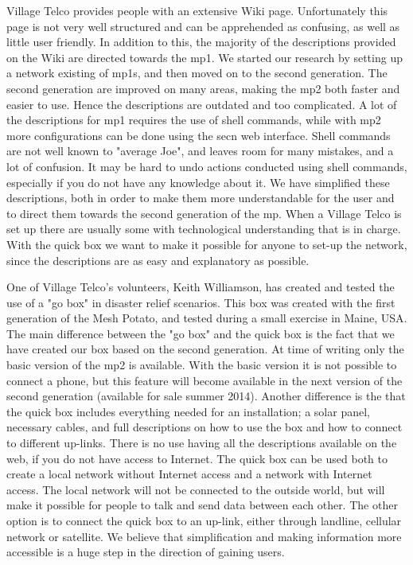 Village Telco provides people with an extensive Wiki page. Unfortunately this page is not very well structured and can be apprehended as confusing, as well as little user friendly. In addition to this, the majority of the descriptions provided on the Wiki are directed towards the \gls{mp1}. We started our research by setting up a network existing of \glspl{mp1}, and then moved on to the second generation. The second generation are improved on many areas, making the \gls{mp2} both faster and easier to use. Hence the descriptions are outdated and too complicated. A lot of the descriptions for \gls{mp1} requires the use of shell commands, while with \gls{mp2} more configurations can be done using the \gls{secn} web interface. Shell commands are not well known to "average Joe", and leaves room for many mistakes, and a lot of confusion. It may be hard to undo actions conducted using shell commands, especially if you do not have any knowledge about it. We have simplified these descriptions, both in order to make them more understandable for the user and to direct them towards the second generation of the \gls{mp}. When a Village Telco is set up there are usually some with technological understanding that is in charge. With the \gls{quick} box we want to make it possible for anyone to set-up the network, since the descriptions are as easy and explanatory as possible. 

One of Village Telco's volunteers, Keith Williamson, has created and tested the use of a "go box" in disaster relief scenarios. This box was created with the first generation of the Mesh Potato, and tested during a small exercise in Maine, USA. The main difference between the "go box" and the \gls{quick} box is the fact that we have created our box based on the second generation. At time of writing only the basic version of the \gls{mp2} is available. With the basic version it is not possible to connect a phone, but this feature will become available in the next version of the second generation (available for sale summer 2014). Another difference is the that the \gls{quick} box includes everything needed for an installation;  a solar panel, necessary cables, and full descriptions on how to use the box and how to connect to different up-links. There is no use having all the descriptions available on the web, if you do not have access to Internet. The \gls{quick} box can be used both to create a local network without Internet access and a network with Internet access. The local network will not be connected to the outside world, but will make it possible for people to talk and send data between each other. The other option is to connect the \gls{quick} box to an up-link, either through landline, cellular network or satellite. We believe that simplification and making information more accessible is a huge step in the direction of gaining users. 


